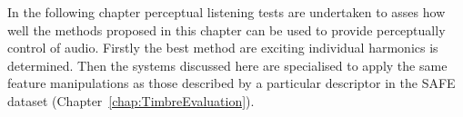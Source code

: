 	In the following chapter perceptual listening tests are undertaken to asses how well the methods proposed in this
	chapter can be used to provide perceptually control of audio. Firstly the best method are exciting individual
	harmonics is determined. Then the systems discussed here are specialised to apply the same feature manipulations as
	those described by a particular descriptor in the SAFE dataset (Chapter~\ref{chap:TimbreEvaluation}).
